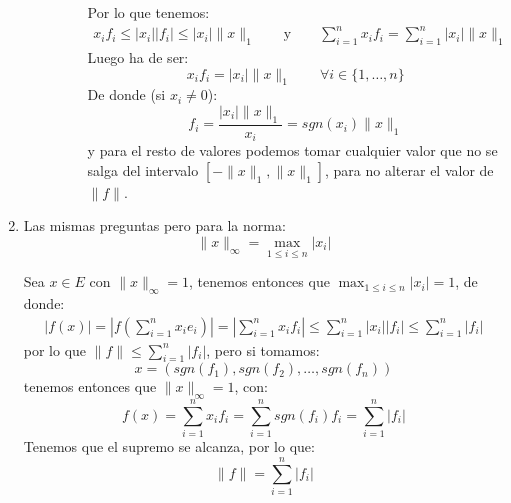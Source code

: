 \begin{ejercicio}
\begin{enumerate}[label=\alph*)]
\begin{enumerate}
\begin{description}
\begin{equation*}
                            \end{equation*}
                            Por lo que tenemos:
                            \begin{gather*}
                                x_if_i \leq |x_i||f_i| \leq |x_i|\|x\|_1 \qquad \text{y} \qquad 
                                \sum_{i=1}^{n}x_if_i = \sum_{i=1}^{n}|x_i|\|x\|_1
                            \end{gather*}
                            Luego ha de ser:
                            \begin{equation*}
                                x_if_i = |x_i|\|x\|_1 \qquad \forall i \in \{1,\ldots,n\}
                            \end{equation*}
                            De donde (si $x_i \neq 0$):
                            \begin{equation*}
                                f_i = \dfrac{|x_i|\|x\|_1}{x_i} = sgn(x_i)\|x\|_1
                            \end{equation*}
                            y para el resto de valores podemos tomar cualquier valor que no se salga del intervalo $[-\|x\|_1,\|x\|_1]$, para no alterar el valor de $\|f\|$.
                    \end{description}
            \end{enumerate}
        \item Las mismas preguntas pero para la norma:
            \begin{equation*}
                \|x\|_\infty = \max_{1\leq i \leq n}|x_i|
            \end{equation*}

            Sea $x\in E$ con $\|x\|_\infty=1$, tenemos entonces que $\max_{1\leq i\leq n}|x_i| =1$, de donde:
            \begin{align*}
                |f(x)| = \left|f\left(\sum_{i=1}^{n}x_ie_i\right)\right| = \left|\sum_{i=1}^{n}x_if_i\right| \leq \sum_{i=1}^{n}|x_i||f_i| \leq \sum_{i=1}^{n}|f_i|
            \end{align*}
            por lo que $\|f\| \leq \sum_{i=1}^{n}|f_i|$, pero si tomamos:
            \begin{equation*}
                x = (sgn(f_1),sgn(f_2),\ldots,sgn(f_n))
            \end{equation*}
            tenemos entonces que $\|x\|_\infty=1$, con:
            \begin{equation*}
                f(x) = \sum_{i=1}^{n}x_if_i = \sum_{i=1}^{n}sgn(f_i)f_i = \sum_{i=1}^{n}|f_i|
            \end{equation*}
            Tenemos que el supremo se alcanza, por lo que:
            \begin{equation*}
                \|f\| = \sum_{i=1}^{n}|f_i|
            \end{equation*}


\end{enumerate}
\end{ejercicio}
